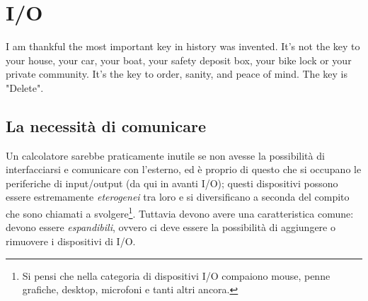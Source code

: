\documentclass[class=book, crop=false, oneside]{standalone}
\begin{document}
\chapter{I/O}\begin{fquote}I am thankful the most important key in history was invented. It's not the key to your house, your car, your boat, your safety deposit box, your bike lock or your private community. It's the key to order, sanity, and peace of mind. The key is "Delete".
 \end{fquote}

\section{La necessità di comunicare}
Un calcolatore sarebbe praticamente inutile se non avesse la possibilità di interfacciarsi e comunicare con l'esterno, ed è proprio di questo che si occupano le periferiche di input/output (da qui in avanti I/O); questi dispositivi possono essere estremamente \emph{eterogenei} tra loro e si diversificano a seconda del compito che sono chiamati a svolgere\footnote{Si pensi che nella categoria di dispositivi I/O compaiono mouse, penne grafiche, desktop, microfoni e tanti altri ancora.}. Tuttavia devono avere una caratteristica comune: devono essere \emph{espandibili}, ovvero ci deve essere la possibilità di aggiungere o rimuovere i dispositivi di I/O.
\end{document}

